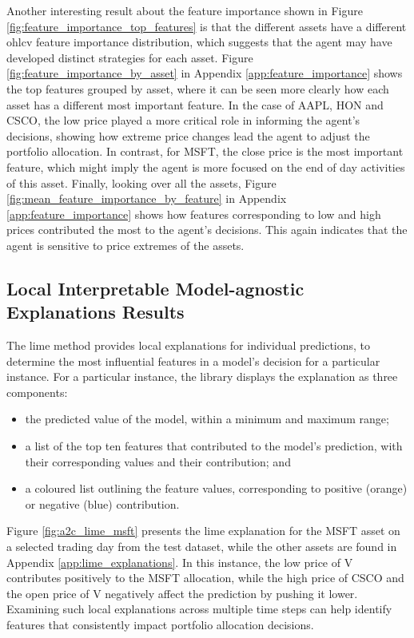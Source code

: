Another interesting result about the feature importance shown in Figure \ref{fig:feature_importance_top_features} is that the different assets have a different \acrshort{ohlcv} feature importance distribution, which suggests that the agent may have developed distinct strategies for each asset. Figure \ref{fig:feature_importance_by_asset} in Appendix \ref{app:feature_importance} shows the top features grouped by asset, where it can be seen more clearly how each asset has a different most important feature. In the case of AAPL, HON and CSCO, the low price played a more critical role in informing the agent's decisions, showing how extreme price changes lead the agent to adjust the portfolio allocation. In contrast, for MSFT, the close price is the most important feature, which might imply the agent is more focused on the end of day activities of this asset. Finally, looking over all the assets, Figure \ref{fig:mean_feature_importance_by_feature} in Appendix \ref{app:feature_importance} shows how features corresponding to low and high prices contributed the most to the agent's decisions. This again indicates that the agent is sensitive to price extremes of the assets.

\subsection{Local Interpretable Model-agnostic Explanations Results} \label{sec:lime-results}

The \acrshort{lime} method provides local explanations for individual predictions, to determine the most influential features in a model's decision for a particular instance. For a particular instance, the library displays the explanation as three components:
\begin{itemize}
    \item the predicted value of the model, within a minimum and maximum range;
    \item a list of the top ten features that contributed to the model's prediction, with their corresponding values and their contribution; and
    \item a coloured list outlining the feature values, corresponding to positive (orange) or negative (blue) contribution.
\end{itemize}

Figure \ref{fig:a2c_lime_msft} presents the \acrshort{lime} explanation for the MSFT asset on a selected trading day from the test dataset, while the other assets are found in Appendix \ref{app:lime_explanations}. In this instance, the low price of V contributes positively to the MSFT allocation, while the high price of CSCO and the open price of V negatively affect the prediction by pushing it lower. Examining such local explanations across multiple time steps can help identify features that consistently impact portfolio allocation decisions.

